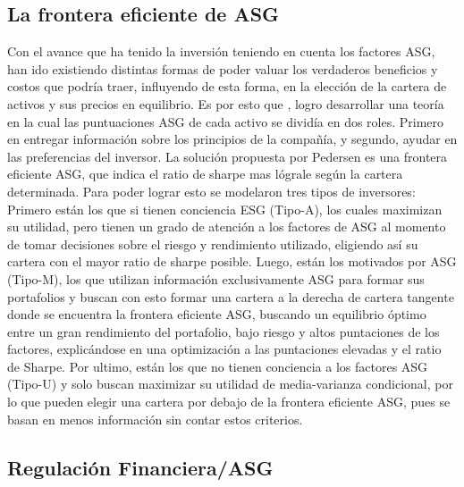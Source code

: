 \vspace{0.5cm}

\subsection{La frontera eficiente de ASG}


Con el avance que ha tenido la inversión teniendo en cuenta los factores ASG, han ido existiendo distintas formas de poder valuar los verdaderos beneficios y costos que podría traer, influyendo de esta forma, en la elección de la cartera de activos y sus precios en equilibrio. Es por esto que , logro desarrollar una teoría en la cual las puntuaciones ASG de cada activo se dividía en dos roles. Primero en entregar información sobre los principios de la compañía, y segundo, ayudar en las preferencias del inversor. La solución propuesta por Pedersen es una frontera eficiente ASG, que indica el ratio de sharpe mas lógrale según la cartera determinada. Para poder lograr esto se modelaron tres tipos de inversores:  Primero están los que si tienen conciencia ESG (Tipo-A), los cuales maximizan su utilidad, pero tienen un grado de atención a los factores de ASG al momento de tomar decisiones sobre el riesgo y rendimiento utilizado, eligiendo así su cartera con el mayor ratio de sharpe posible. Luego, están los motivados por ASG (Tipo-M), los que utilizan información exclusivamente ASG para formar sus portafolios y buscan con esto formar una cartera a la derecha de cartera tangente donde se encuentra la frontera eficiente ASG, buscando un equilibrio óptimo entre un gran rendimiento del portafolio, bajo riesgo y altos puntaciones de los factores, explicándose en una optimización a las puntaciones elevadas y el ratio de Sharpe. Por ultimo, están los que no tienen conciencia a los factores ASG (Tipo-U) y solo buscan maximizar su utilidad de media-varianza condicional, por lo que pueden elegir una cartera por debajo de la frontera eficiente ASG, pues se basan en menos información sin contar estos criterios.

\vspace{0.5cm}

\subsection{Regulación Financiera/ASG}

